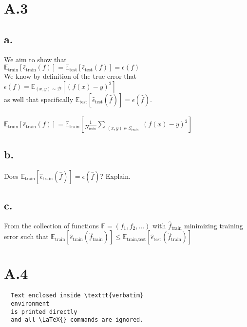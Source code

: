 \documentclass{article}
\newcommand{\field}[1]{\mathbb{#1}}
\newcommand{\1}{\mathbf{1}}
\newcommand{\E}{\mathbb{E}}
\newcommand{\F}{\field{F}} %
\begin{document}
\section*{A.3}
{\Large 

\subsection*{a.}

We aim to show that \\
$\E_{\text{train}}[\widehat{\epsilon}_{\text{train}}(f)] = \E_{\text{test}}[\widehat{\epsilon}_{\text{test}}(f)] = \epsilon(f)$ \\
We know by definition of the true error that $\epsilon(f) = \E_{(x,y) \sim \mathcal{D}}[(f(x) - y)^2]$ \\
as well that specifically $\E_{\text{test}}[\widehat{\epsilon}_{\text{test}}(\widehat{f})] = \epsilon(\widehat{f})$. \\ \\

$\E_{\text{train}}[\widehat{\epsilon}_{\text{train}}(f)] = \E_{\text{train}}[\frac{1}{N_{\text{train}}} \sum\limits_{\substack{(x,y) \in S_{\text{train}}}} (f(x) - y)^2]$ \\

\subsection*{b.}

Does $\E_{\text{train}}[\widehat{\epsilon}_{\text{train}}(\widehat{f})] = \epsilon(\widehat{f})$? Explain.

\subsection*{c.}
From the collection of functions $\F = (f_1, f_2, \dots)$ with $\widehat{f}_{\text{train}}$ minimizing training error such that $\E_{\text{train}}[\widehat{\epsilon}_{\text{train}}(\widehat{f}_{\text{train}})] \leq \E_{\text{train,test}}[\widehat{\epsilon}_{\text{test}}(\widehat{f}_{\text{train}})]$

}

\section*{A.4}
{\Large 


\begin{verbatim}
  Text enclosed inside \texttt{verbatim}
  environment 
  is printed directly 
  and all \LaTeX{} commands are ignored.
\end{verbatim}

}
\end{document}
